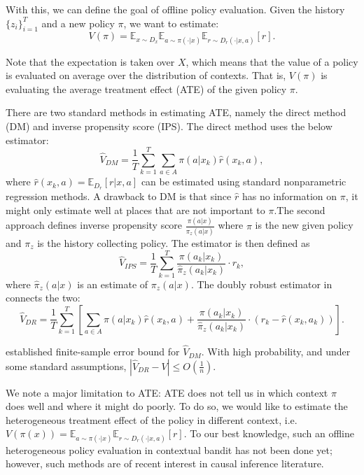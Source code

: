 \documentclass{article}
\begin{document}
With this, we can define the goal of offline policy evaluation. Given the history $\{z_i\}_{i=1}^T$ and a new policy $\pi$, we want to estimate:
$$ V(\pi) = \mathbb{E}_{x \sim D_x}\mathbb{E}_{a \sim \pi(\cdot|x)}\mathbb{E}_{r \sim D_r(\cdot | x, a)}[r].$$

Note that the expectation is taken over $X$, which means that the value of a policy is evaluated on average over the distribution of contexts. That is, $V(\pi)$ is evaluating the average treatment effect (ATE) of the given policy $\pi$. %

There are two standard methods in estimating ATE, namely the direct method (DM) and inverse propensity score (IPS). The direct method uses the below estimator:
$$\widehat{V}_{DM} = \frac{1}{T}{\sum_{k=1}^T}\sum_{a \in A}\pi(a|x_k)\hat{r}(x_k, a),$$ where $\hat{r}(x_k, a) = \mathbb{E}_{D_r}[r|x,a]$ can be estimated using standard nonparametric regression methods. A drawback to DM is that since $\hat{r}$ has no information on $\pi$, it might only estimate well at places that are not important to $\pi$.The second approach defines inverse propensity score $\frac{\pi(a|x)}{\pi_{z}(a|x)}$ where $\pi$ is the new given policy and $\pi_{z}$ is the history collecting policy. The estimator is then defined as
$$\widehat{V}_{IPS} = \frac{1}{T}\sum_{k=1}^T\frac{\pi(a_k|x_k)}{\hat{\pi}_{z}(a_k|x_k)} \cdot r_k,$$ where $\hat{\pi}_{z}(a|x)$ is an estimate of $\pi_{z}(a|x)$. The doubly robust estimator in \cite{dudik2014doubly} connects the two:
$$\widehat{V}_{DR} = \frac{1}{T}\sum_{k=1}^T \left[ \sum_{a \in A} \pi(a|x_k)\hat{r}(x_k, a) + \frac{\pi(a_k|x_k)}{\hat{\pi}_{z}(a_k|x_k)} \cdot (r_k - \hat{r}(x_k, a_k))\right].$$

\cite{dudik2014doubly} established finite-sample error bound for $\widehat{V}_{DM}$. With high probability, and under some standard assumptions, $|\widehat{V}_{DR} - V| \leq O(\frac{1}{n}).$


We note a major limitation to ATE: ATE does not tell us in which context $\pi$ does well and where it might do poorly. To do so, we would like to estimate the heterogeneous treatment effect of the policy in different context, i.e. $ V(\pi(x)) = \mathbb{E}_{a \sim \pi(\cdot|x)}\mathbb{E}_{r \sim D_r(\cdot | x, a)}[r].$ To our best knowledge, such an offline heterogeneous policy evaluation in contextual bandit has not been done yet; however, such methods are of recent interest in causal inference literature.
\end{document}
